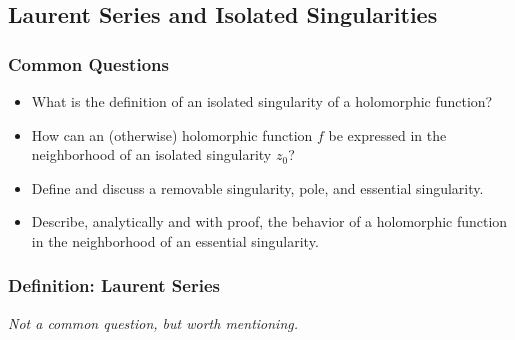 \documentclass[11pt, a4paper]{article}
\newcommand{\question}[1]{\textit{#1}\vspace{2mm}}
\begin{document}
\subsection{Laurent Series and Isolated Singularities}
\subsubsection{Common Questions}
\begin{itemize}
	
	\item What is the definition of an isolated singularity of a holomorphic function? 
	
	\item How can an (otherwise) holomorphic function $ f $ be expressed in the neighborhood of an isolated singularity $ z_0 $?
	
	\item Define and discuss a removable singularity, pole, and essential singularity. 
	
	\item Describe, analytically  and with proof, the behavior of a holomorphic function in the neighborhood of an essential singularity. 


\end{itemize}


\subsubsection{Definition: Laurent Series}
\question{Not a common question, but worth mentioning.}
\end{document}
